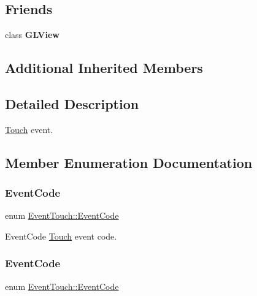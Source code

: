 \subsection*{Friends}
\begin{DoxyCompactItemize}
\item 
\mbox{\label{classEventTouch_a09787e486afef1b86760d393631c3fa2}} 
class {\bfseries G\+L\+View}
\end{DoxyCompactItemize}
\subsection*{Additional Inherited Members}


\subsection{Detailed Description}
\hyperlink{classTouch}{Touch} event. 

\subsection{Member Enumeration Documentation}
\mbox{\label{classEventTouch_a35816ad7349f0b7accc0a30a469b0087}} 
\subsubsection{\texorpdfstring{Event\+Code}{EventCode}\hspace{0.1cm}{\footnotesize\ttfamily [1/2]}}
{\footnotesize\ttfamily enum \hyperlink{classEventTouch_a35816ad7349f0b7accc0a30a469b0087}{Event\+Touch\+::\+Event\+Code}\hspace{0.3cm}{\ttfamily [strong]}}

Event\+Code \hyperlink{classTouch}{Touch} event code. \mbox{\label{classEventTouch_a35816ad7349f0b7accc0a30a469b0087}} 
\subsubsection{\texorpdfstring{Event\+Code}{EventCode}\hspace{0.1cm}{\footnotesize\ttfamily [2/2]}}
{\footnotesize\ttfamily enum \hyperlink{classEventTouch_a35816ad7349f0b7accc0a30a469b0087}{Event\+Touch\+::\+Event\+Code}\hspace{0.3cm}{\ttfamily [strong]}}


